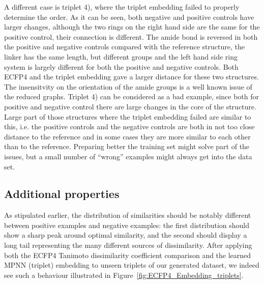 \documentclass[doublespacing]{bmcart}
\begin{document}
A different case is triplet 4), where the triplet embedding failed to properly determine the order. As it can be seen, both negative and positive controls have larger changes, although the two rings on the right hand side are the same for the positive control, their connection is different. The amide bond is reversed in both the positive and negative controls compared with the reference structure, the linker has the same length, but different groups and the left hand side ring system is largely different for both the positive and negative controls. Both ECFP4 and the triplet embedding gave a larger distance for these two structures. The insensitvity on the orientation of the amide groups is a well known issue of the reduced graphs. Triplet 4) can be considered as a bad example, since both for positive and negative control there are large changes in the core of the structure. Large part of those structures where the triplet embedding failed are similar to this, i.e. the positive controls and the negative controls are both in not too close distance to the reference and in some cases they are more similar to each other than to the reference. Preparing better the training set might solve part of the issues, but a small number of ``wrong'' examples might always get into the data set.

\subsection*{Additional properties}
As stipulated earlier, the distribution of similarities should be notably different between positive examples and negative examples: the first distribution should show a sharp peak around optimal similarity, and the second should display a long tail representing the many different sources of dissimilarity. After applying both the ECFP4 Tanimoto dissimilarity coefficient comparison and the learned MPNN (triplet) embedding to unseen triplets of our generated dataset, we indeed see such a behaviour illustrated in Figure~\ref{fig:ECFP4_Embedding_triplets}.
\end{document}
